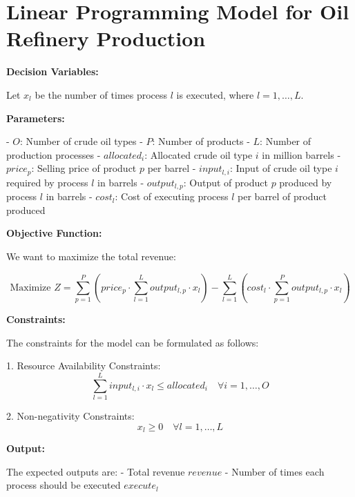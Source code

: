 \documentclass{article}
\begin{document}
\section*{Linear Programming Model for Oil Refinery Production}

\textbf{Decision Variables:}

Let \( x_l \) be the number of times process \( l \) is executed, where \( l = 1, \ldots, L \).

\textbf{Parameters:}

- \( O \): Number of crude oil types
- \( P \): Number of products
- \( L \): Number of production processes
- \( allocated_i \): Allocated crude oil type \( i \) in million barrels
- \( price_p \): Selling price of product \( p \) per barrel
- \( input_{l,i} \): Input of crude oil type \( i \) required by process \( l \) in barrels
- \( output_{l,p} \): Output of product \( p \) produced by process \( l \) in barrels
- \( cost_l \): Cost of executing process \( l \) per barrel of product produced

\textbf{Objective Function:}

We want to maximize the total revenue:

\[
\text{Maximize } Z = \sum_{p=1}^{P} \left( price_p \cdot \sum_{l=1}^{L} output_{l,p} \cdot x_l \right) - \sum_{l=1}^{L} (cost_l \cdot \sum_{p=1}^{P} output_{l,p} \cdot x_l)
\]

\textbf{Constraints:}

The constraints for the model can be formulated as follows:

1. Resource Availability Constraints:
\[
\sum_{l=1}^{L} input_{l,i} \cdot x_l \leq allocated_i \quad \forall i=1,\ldots,O
\]

2. Non-negativity Constraints:
\[
x_l \geq 0 \quad \forall l=1,\ldots,L
\]

\textbf{Output:}

The expected outputs are:
- Total revenue \( revenue \)
- Number of times each process should be executed \( execute_l \)
\end{document}
